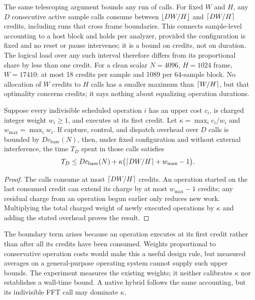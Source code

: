 The same telescoping argument bounds any run of calls. For fixed $W$ and $H$,
any $D$ consecutive active sample calls consume between $\left\lfloor DW/H\right\rfloor$ and
$\left\lceil DW/H\right\rceil$ credits, including runs that cross frame boundaries. This
connects sample-level accounting to a host block and holds per analyzer,
provided the configuration is fixed and no reset or pause intervenes; it is a
bound on credits, not on duration. The logical load over any such interval
therefore differs from its proportional share by less than one credit. For a
clean scalar $N=4096$, $H=1024$ frame, $W=17410$: at most 18 credits per
sample and 1089 per 64-sample block. No allocation of $W$ credits to $H$ calls
has a smaller maximum than $\left\lceil W/H\right\rceil$, but that optimality concerns credits;
it says nothing about equalizing operation durations.

\begin{proposition}
Suppose every indivisible scheduled operation $i$ has an upper cost $c_i$,
is charged integer weight $w_i\ge1$, and executes at its first credit.
Let $\kappa=\max_i c_i/w_i$ and $w_{\max}=\max_i w_i$. If capture, control,
and dispatch overhead over $D$ calls is bounded by $D c_{\mathrm{base}}(N)$,
then, under fixed configuration and without external interference, the time
$T_D$ spent in those calls satisfies
\[
 T_D\le D c_{\mathrm{base}}(N)+
 \kappa\bigl(\left\lceil DW/H\right\rceil+w_{\max}-1\bigr).
\]
\end{proposition}
\begin{proof}
The calls consume at most $\left\lceil DW/H\right\rceil$ credits. An operation started on the
last consumed credit can extend its charge by at most $w_{\max}-1$ credits;
any residual charge from an operation begun earlier only reduces new work.
Multiplying the total charged weight of newly executed operations by
$\kappa$ and adding the stated overhead proves the result.
\end{proof}
The boundary term arises because an operation executes at its first credit
rather than after all its credits have been consumed. Weights proportional to
conservative operation costs would make this a useful design rule, but
measured averages on a general-purpose operating system cannot supply such
upper bounds. The experiment measures the existing weights; it neither
calibrates $\kappa$ nor establishes a wall-time bound. A native hybrid follows
the same accounting, but its indivisible FFT call may dominate $\kappa$.



